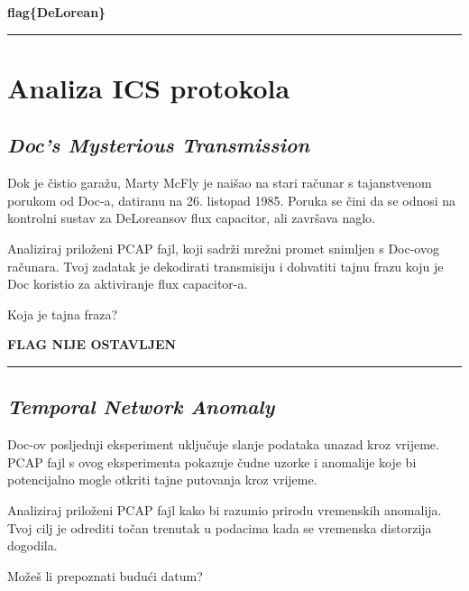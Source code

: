 \documentclass{article}
\begin{document}
\begin{center}
    \textbf{flag\{DeLorean\}}
\end{center}
\noindent\rule{\textwidth}{0.4pt}
\newpage
\section{Analiza ICS protokola}
\label{sec:access}
\subsection{\textit{Doc's Mysterious Transmission}}
\begin{tcolorbox}[
    colback=gray!5,  %
    colframe=gray!75,  %
    title=\textbf{Zadatak}]
    Dok je čistio garažu, Marty McFly je naišao na stari računar s tajanstvenom porukom od Doc-a, datiranu na 26. listopad 1985. Poruka se čini da se odnosi na kontrolni sustav za DeLoreansov flux capacitor, ali završava naglo.

    Analiziraj priloženi PCAP fajl, koji sadrži mrežni promet snimljen s Doc-ovog računara. Tvoj zadatak je dekodirati transmisiju i dohvatiti tajnu frazu koju je Doc koristio za aktiviranje flux capacitor-a.

    Koja je tajna fraza?
\end{tcolorbox}

\begin{center}
    \textbf{FLAG NIJE OSTAVLJEN}
\end{center}
\noindent\rule{\textwidth}{0.4pt}

\subsection{\textit{Temporal Network Anomaly}}
\begin{tcolorbox}[
    colback=gray!5,  %
    colframe=gray!75,  %
    title=\textbf{Zadatak}]
    Doc-ov posljednji eksperiment uključuje slanje podataka unazad kroz vrijeme. PCAP fajl s ovog eksperimenta pokazuje čudne uzorke i anomalije koje bi potencijalno mogle otkriti tajne putovanja kroz vrijeme.

    Analiziraj priloženi PCAP fajl kako bi razumio prirodu vremenskih anomalija. Tvoj cilj je odrediti točan trenutak u podacima kada se vremenska distorzija dogodila.

    Možeš li prepoznati budući datum?
\end{tcolorbox}
\end{document}
